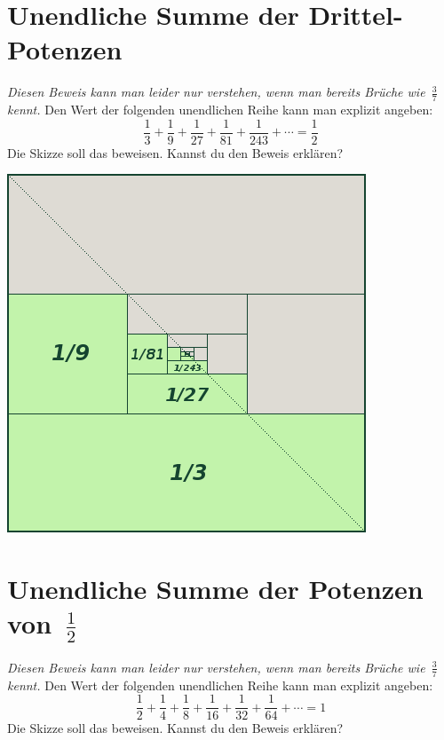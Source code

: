 \documentclass{../zirkelblatt}
\begin{document}
\section*{Unendliche Summe der Drittel-Potenzen}
\emph{Diesen Beweis kann man leider nur verstehen, wenn man bereits Brüche
wie~$\frac{3}{7}$ kennt.}
Den Wert der folgenden unendlichen Reihe kann man
explizit angeben:
\[ \frac{1}{3} + \frac{1}{9} + \frac{1}{27} +
\frac{1}{81} + \frac{1}{243} + \cdots = \frac{1}{2} \]
Die Skizze soll das beweisen. Kannst du den Beweis erklären?
\begin{center}
\includegraphics[scale=0.5]{geometrische-reihe-3}
\end{center}


\vfill
\section*{Unendliche Summe der Potenzen von~$\frac{1}{2}$}
\emph{Diesen Beweis kann man leider nur verstehen, wenn man bereits Brüche
wie~$\frac{3}{7}$ kennt.}
Den Wert der folgenden unendlichen Reihe kann man
explizit angeben:
\[ \frac{1}{2} + \frac{1}{4} + \frac{1}{8} +
\frac{1}{16} + \frac{1}{32} + \frac{1}{64} + \cdots = 1 \]
Die Skizze soll das beweisen. Kannst du den Beweis erklären?
\end{document}
